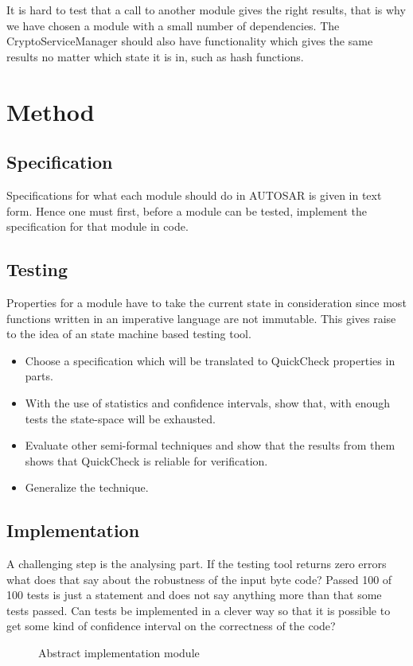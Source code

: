 \documentclass[11pt,a4paper]{report}
\begin{document}
It is hard to test that a call to another module gives the right results,
that is why we have chosen a module with a small number of
dependencies.
The CryptoServiceManager should also have functionality which gives the same
results no matter which state it is in, such as hash
functions\cite{SPEC:AUTOSAR:CSM}.

\chapter{Method}
\section{Specification}
Specifications for what each module should do in AUTOSAR is given in text form.
Hence one must first, before a module can be tested, implement the specification
for that module in code.
\section{Testing}
Properties for a module have to take the current state in consideration since
most functions written in an imperative language are not immutable. This gives
raise to the idea of an state machine based testing tool.
\begin{itemize}
\item Choose a specification which will be translated to QuickCheck properties
in parts.
\item With the use of statistics and confidence intervals, show that, with
enough tests the state-space will be exhausted.
\item Evaluate other semi-formal techniques and show that the results from them
shows that QuickCheck is reliable for verification.
\item Generalize the technique.
\end{itemize}

\section{Implementation}
A challenging step is the analysing part. If the testing tool returns zero
errors what does that say about the robustness of the input byte code? Passed
100 of 100 tests is just a statement and does not say anything more than that
some tests passed. Can tests be implemented in a clever way so that it is
possible to get some kind of confidence interval on the correctness of the code?
\begin{figure}[!ht]

\caption{Abstract implementation module}
\end{figure}
\end{document}

